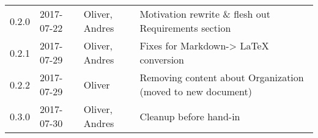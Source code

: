 \begin{longtable}[]{@{}llll@{}}
\begin{minipage}[t]{0.10\columnwidth}
0.2.0\strut
\end{minipage} & \begin{minipage}[t]{0.06\columnwidth}\raggedright\strut
2017-07-22\strut
\end{minipage} & \begin{minipage}[t]{0.15\columnwidth}\raggedright\strut
Oliver, Andres\strut
\end{minipage} & \begin{minipage}[t]{0.23\columnwidth}\raggedright\strut
Motivation rewrite \& flesh out Requirements section\strut
\end{minipage}\tabularnewline
\begin{minipage}[t]{0.10\columnwidth}\raggedright\strut
0.2.1\strut
\end{minipage} & \begin{minipage}[t]{0.06\columnwidth}\raggedright\strut
2017-07-29\strut
\end{minipage} & \begin{minipage}[t]{0.15\columnwidth}\raggedright\strut
Oliver, Andres\strut
\end{minipage} & \begin{minipage}[t]{0.23\columnwidth}\raggedright\strut
Fixes for Markdown-\textgreater{} LaTeX conversion\strut
\end{minipage}\tabularnewline
\begin{minipage}[t]{0.10\columnwidth}\raggedright\strut
0.2.2\strut
\end{minipage} & \begin{minipage}[t]{0.06\columnwidth}\raggedright\strut
2017-07-29\strut
\end{minipage} & \begin{minipage}[t]{0.15\columnwidth}\raggedright\strut
Oliver\strut
\end{minipage} & \begin{minipage}[t]{0.23\columnwidth}\raggedright\strut
Removing content about Organization (moved to new document)\strut
\end{minipage}\tabularnewline
\begin{minipage}[t]{0.10\columnwidth}\raggedright\strut
0.3.0\strut
\end{minipage} & \begin{minipage}[t]{0.06\columnwidth}\raggedright\strut
2017-07-30\strut
\end{minipage} & \begin{minipage}[t]{0.15\columnwidth}\raggedright\strut
Oliver, Andres\strut
\end{minipage} & \begin{minipage}[t]{0.23\columnwidth}\raggedright\strut
Cleanup before hand-in\strut
\end{minipage}\tabularnewline
\bottomrule
\end{longtable}

